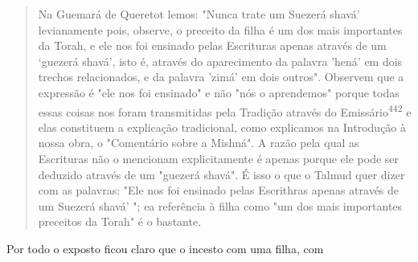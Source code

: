 \begin{quote}
Na Guemará de Queretot lemos: "Nunca trate um Suezerá shavá'
levianamente pois, observe, o preceito da filha é um dos mais
importantes da Torah, e ele nos foi ensinado pelas Escrituras apenas
através de um `guezerá shavá', isto é, através do aparecimento da
palavra 'hená' em dois trechos rela­cionados, e da palavra 'zimá' em
dois outros". Observem que a expressão é "ele nos foi ensinado" e não
"nós o aprendemos" porque todas essas coisas nos foram transmitidas pela
Tradição através do Emissário\textsuperscript{442} e elas constituem a
explicação tradicional, como explicamos na Introdução à nossa obra, o
"Co­mentário sobre a Mishná". A razão pela qual as Escrituras não o
mencionam explicitamente é apenas porque ele pode ser deduzido através
de um "guezerá shavá". É isso o que o Talmud quer dizer com as palavras:
"Ele nos foi ensina­do pelas Escrithras apenas através de um Suezerá
shavá' "; ea referência à filha como "um dos mais importantes preceitos
da Torah" é o bastante.
\end{quote}

Por todo o exposto ficou claro que o incesto com uma filha, com


